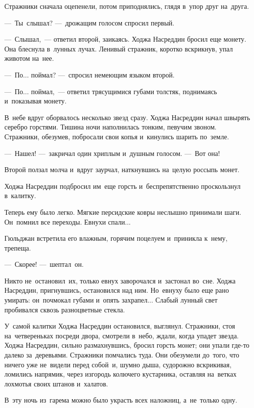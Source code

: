 \documentclass[12pt,a4paper]{book}
\begin{document}
Стражники сначала оцепенели, потом приподнялись, глядя в~упор друг на~друга.

—~Ты~слышал? —~дрожащим голосом спросил первый.

—~Слышал,~— ответил второй, заикаясь. Ходжа Насреддин бросил еще монету. Она блеснула в~лунных лучах. Ленивый стражник, коротко вскрикнув, упал животом на~нее.

—~По... поймал? —~спросил немеющим языком второй.

—~По... поймал,~— ответил трясущимися губами толстяк, поднимаясь и~показывая монету.

В~небе вдруг оборвалось несколько звезд сразу. Ходжа Насреддин начал швырять серебро горстями. Тишина ночи наполнилась тонким, певучим звоном. Стражники, обезумев, побросали свои копья и~кинулись шарить по~земле.

—~Нашел! —~закричал один хриплым и~душным голосом. —~Вот она!

Второй ползал молча и~вдруг заурчал, наткнувшись на~целую россыпь монет.

Ходжа Насреддин подбросил им~еще горсть и~беспрепятственно проскользнул в~калитку.

Теперь ему было легко. Мягкие персидские ковры неслышно принимали шаги. Он~помнил все переходы. Евнухи спали...

Гюльджан встретила его влажным, горячим поцелуем и~приникла к~нему, трепеща.

—~Скорее! —~шептал~он.

Никто не~остановил~их, только евнух заворочался и~застонал во~сне. Ходжа Насреддин, пригнувшись, остановился над ним. Но~евнуху было еще рано умирать: он~почмокал губами и~опять захрапел... Слабый лунный свет пробивался сквозь разноцветные стекла.

У~самой калитки Ходжа Насреддин остановился, выглянул. Стражники, стоя на~четвереньках посреди двора, смотрели в~небо, ждали, когда упадет звезда. Ходжа Насреддин, сильно размахнувшись, бросил горсть монет; они упали где-то далеко за~деревьями. Стражники помчались туда. Они обезумели до~того, что ничего уже не~видели перед собой~и, шумно дыша, судорожно вскрикивая, ломились напрямик, через изгородь колючего кустарника, оставляя на~ветках лохмотья своих штанов и~халатов.

В~эту ночь из~гарема можно было украсть всех наложниц, а~не~только одну.
\end{document}
